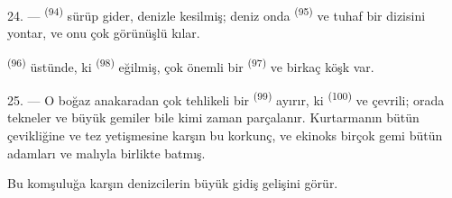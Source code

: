\VUsaut{3.0mm}
\VUsaut{3.0mm}

24. ---  \textsuperscript{(94)} sürüp gider, denizle
kesilmiş; deniz onda  \textsuperscript{(95)} ve
 tuhaf bir dizisini yontar, ve onu çok görünüşlü kılar.

 \textsuperscript{(96)} üstünde, ki 
\textsuperscript{(98)} eğilmiş, çok önemli bir 
\textsuperscript{(97)} ve birkaç köşk var.

25. --- O boğaz anakaradan çok tehlikeli bir 
\textsuperscript{(99)} ayırır, ki  \textsuperscript{(100)} ve
 çevrili; orada tekneler ve büyük gemiler bile kimi
zaman parçalanır. Kurtarmanın bütün çevikliğine ve  tez yetişmesine karşın bu  korkunç, ve
ekinoks  birçok gemi bütün adamları ve malıyla birlikte
batmış.

Bu komşuluğa karşın  denizcilerin büyük gidiş gelişini görür.
\VUsaut{6.0mm}
\VUfilet{22mm}
